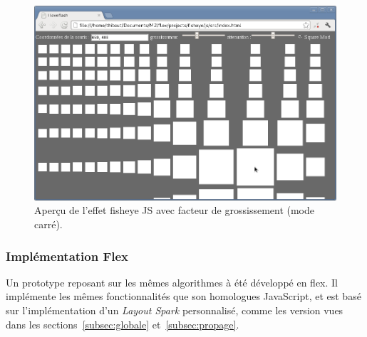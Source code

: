 \begin{minipage}[H]{.5\textwidth}
\begin{figure}[H]
  \centering
  \includegraphics[width=\textwidth]{../resources/illustrations/js_screen_3}
  \caption{Aperçu de l'effet fisheye JS avec facteur de grossissement (mode carré).}
  \label{fig:js_6}
\end{figure}
\end{minipage}

\subsubsection{Implémentation Flex}

Un prototype reposant sur les mêmes algorithmes à été développé en flex. Il implémente les mêmes fonctionnalités que son homologues JavaScript, et est basé sur l'implémentation d'un \emph{Layout Spark} personnalisé, comme les version vues dans les sections~\ref{subsec:globale} et~\ref{subsec:propage}.

